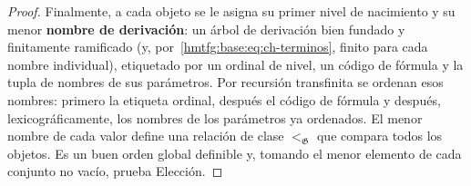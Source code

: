 \begin{proof}
Finalmente, a cada objeto se le asigna su primer nivel de nacimiento y su
menor \textbf{nombre de derivación}: un árbol de derivación bien fundado y
finitamente ramificado (y, por~\eqref{hmtfg:base:eq:ch-terminos}, finito para cada nombre individual), etiquetado por un
ordinal de nivel, un código de fórmula y la tupla de nombres de sus parámetros.
Por recursión transfinita se ordenan esos nombres: primero la etiqueta ordinal,
después el código de fórmula y después, lexicográficamente, los nombres de los
parámetros ya ordenados. El menor nombre de cada valor define una relación de
clase \(<_{\mathfrak G}\) que compara todos los objetos. Es un buen orden
global definible y, tomando el menor elemento de cada conjunto no vacío,
prueba Elección.
\end{proof}


